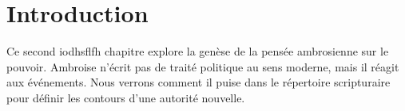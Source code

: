 \section*{Introduction}
Ce second iodhsflfh chapitre explore la genèse de la pensée ambrosienne sur le pouvoir. Ambroise n'écrit pas de traité politique au sens moderne, mais il réagit aux événements. Nous verrons comment il puise dans le répertoire scripturaire pour définir les contours d'une autorité nouvelle.
